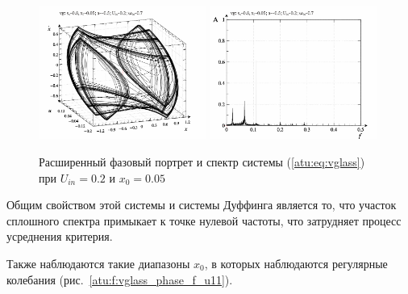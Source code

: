 \begin{figure}[ht!]
\begin{center}
  \includegraphics[width=0.49\textwidth]{p/cha/vg/vg_0-p_phe_0x20_0x70_0x05.png}
  \hfill
  \includegraphics[width=0.49\textwidth]{p/cha/vg/vg_fft-p_f_0x20_0x70_0x05.png}
\end{center}
  \caption{Расширенный фазовый портрет и спектр системы (\ref{atu:eq:vglass}) при $U_{in}=0.2$ и $x_0=0.05$}
\label{atu:f:vglass_phase_f_u10}
\end{figure}

Общим свойством этой системы и системы Дуффинга является то,
что участок сплошного спектра примыкает к точке нулевой частоты,
что затрудняет процесс усреднения критерия.

Также наблюдаются такие диапазоны $x_0$,
в которых наблюдаются регулярные колебания
(рис.~\ref{atu:f:vglass_phase_f_u11}).

